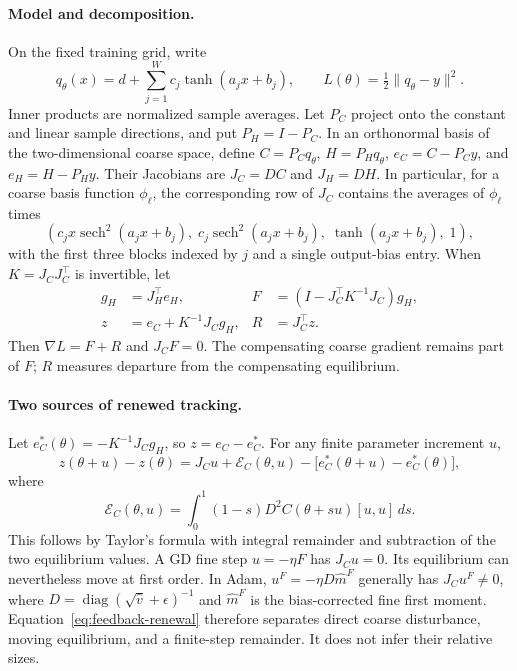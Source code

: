 \paragraph{Model and decomposition.}
On the fixed training grid, write
\[
 q_\theta(x)=d+\sum_{j=1}^W c_j\tanh(a_jx+b_j),\qquad
 L(\theta)=\tfrac12\|q_\theta-y\|^2.
\]
Inner products are normalized sample averages. Let $P_C$ project onto the
constant and linear sample directions, and put $P_H=I-P_C$.
In an orthonormal basis of the two-dimensional coarse space, define
$C=P_Cq_\theta$, $H=P_Hq_\theta$, $e_C=C-P_Cy$, and $e_H=H-P_Hy$.
Their Jacobians are $J_C=DC$ and $J_H=DH$. In particular, for a coarse basis
function $\phi_\ell$, the corresponding row of $J_C$ contains the averages
of $\phi_\ell$ times
\[
 \left(c_jx\operatorname{sech}^2(a_jx+b_j),\;
 c_j\operatorname{sech}^2(a_jx+b_j),\;
 \tanh(a_jx+b_j),\;1\right),
\]
with the first three blocks indexed by $j$ and a single output-bias entry.
When $K=J_CJ_C^\top$ is invertible, let
\begin{align}
 g_H&=J_H^\top e_H,&
 F&=(I-J_C^\top K^{-1}J_C)g_H,\label{eq:feedback-fine}\\
 z&=e_C+K^{-1}J_Cg_H,&R&=J_C^\top z.
\end{align}
Then $\nabla L=F+R$ and $J_CF=0$. The compensating coarse gradient remains
part of $F$; $R$ measures departure from the compensating equilibrium.

\paragraph{Two sources of renewed tracking.}
Let $e_C^*(\theta)=-K^{-1}J_Cg_H$, so $z=e_C-e_C^*$.
For any finite parameter increment $u$,
\begin{equation}
 z(\theta+u)-z(\theta)
 =J_Cu+\mathcal E_C(\theta,u)
   -\big[e_C^*(\theta+u)-e_C^*(\theta)\big],
 \label{eq:feedback-renewal}
\end{equation}
where
\[
 \mathcal E_C(\theta,u)=\int_0^1(1-s)D^2C(\theta+su)[u,u]\,ds.
\]
This follows by Taylor's formula with integral remainder and subtraction
of the two equilibrium values. A GD fine step $u=-\eta F$ has $J_Cu=0$.
Its equilibrium can nevertheless move at first order. In Adam,
$u^F=-\eta D\widehat m^F$ generally has $J_Cu^F\ne0$, where
$D=\operatorname{diag}(\sqrt{\widehat v}+\epsilon)^{-1}$ and $\widehat m^F$
is the bias-corrected fine first moment. Equation~\eqref{eq:feedback-renewal}
therefore separates direct coarse disturbance, moving equilibrium, and a
finite-step remainder. It does not infer their relative sizes.

